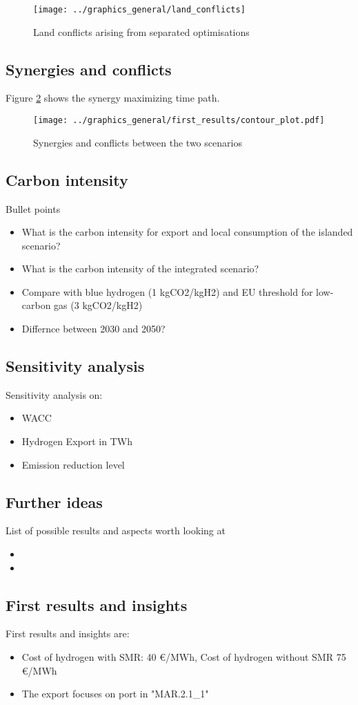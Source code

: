 \begin{figure}[h!]
    \centering
    \texttt{[image: ../graphics\_general/land\_conflicts]}
    \caption{Land conflicts arising from separated optimisations}
    \label{fig:land_conflicts}
\end{figure}




\subsection{Synergies and conflicts}
Figure \ref{fig:contour_plot} shows the synergy maximizing time path.

\begin{figure}[h!]
    \centering
    \texttt{[image: ../graphics\_general/first\_results/contour\_plot.pdf]}
    \caption{Synergies and conflicts between the two scenarios}
    \label{fig:contour_plot}
\end{figure}

\subsection{Carbon intensity}
Bullet points
\begin{itemize}
    \item What is the carbon intensity for export and local consumption of the islanded scenario? 
    \item What is the carbon intensity of the integrated scenario?
    \item Compare with blue hydrogen (1 kgCO2/kgH2) and EU threshold for low-carbon gas (3 kgCO2/kgH2)
    \item Differnce between 2030 and 2050?
\end{itemize}



\subsection{Sensitivity analysis}
Sensitivity analysis on:
\begin{itemize}
    \item WACC
    \item Hydrogen Export in TWh
    \item Emission reduction level
\end{itemize}


\subsection{Further ideas}
List of possible results and aspects worth looking at
\begin{itemize}
    \item 
    \item 
\end{itemize}


\subsection{First results and insights}

First results and insights are:
\begin{itemize}
    \item Cost of hydrogen with SMR: 40 €/MWh, Cost of hydrogen without SMR 75 €/MWh
    \item The export focuses on port in "MAR.2.1{\_}1"
\end{itemize}


